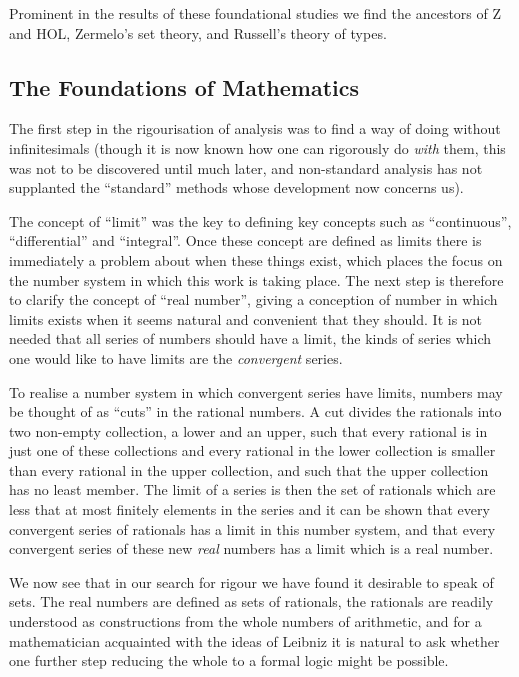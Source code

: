 \documentclass[10pt,titlepage]{book}
\begin{document}
Prominent in the results of these foundational studies we find the ancestors of Z and HOL, Zermelo's set theory, and Russell's theory of types.

\subsection{The Foundations of Mathematics}

The first step in the rigourisation of analysis was to find a way of doing without infinitesimals (though it is now known how one can rigorously do {\it with} them, this was not to be discovered until much later, and non-standard analysis has not supplanted the ``standard'' methods whose development now concerns us).

The concept of ``limit'' was the key to defining key concepts such as ``continuous'', ``differential'' and ``integral''.
Once these concept are defined as limits there is immediately a problem about when these things exist, which places the focus on the number system in which this work is taking place.
The next step is therefore to clarify the concept of ``real number'', giving a conception of number in which limits exists when it seems natural and convenient that they should.
It is not needed that all series of numbers should have a limit, the kinds of series which one would like to have limits are the {\it convergent} series.

To realise a number system in which convergent series have limits, numbers may be thought of as ``cuts'' in the rational numbers.
A cut divides the rationals into two non-empty collection, a lower and an upper, such that every rational is in just one of these collections and every rational in the lower collection is smaller than every rational in the upper collection, and such that the upper collection has no least member.
The limit of a series is then the set of rationals which are less that at most finitely elements in the series and it can be shown that every convergent series of rationals has a limit in this number system, and that every convergent series of these new {\it real} numbers has a limit which is a real number.

We now see that in our search for rigour we have found it desirable to speak of sets.
The real numbers are defined as sets of rationals, the rationals are readily understood as constructions from the whole numbers of arithmetic, and for a mathematician acquainted with the ideas of Leibniz it is natural to ask whether one further step reducing the whole to a formal logic might be possible.
\end{document}
